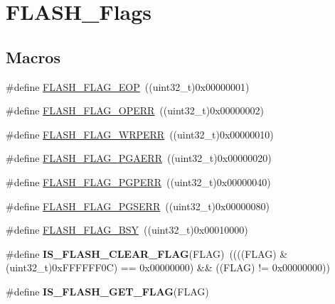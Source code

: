 \hypertarget{group___f_l_a_s_h___flags}{\section{F\-L\-A\-S\-H\-\_\-\-Flags}
\label{group___f_l_a_s_h___flags}
}
\subsection*{Macros}
\begin{DoxyCompactItemize}
\item 
\#define \hyperlink{group___f_l_a_s_h___flags_gaf043ba4d8f837350bfc7754a99fae5a9}{F\-L\-A\-S\-H\-\_\-\-F\-L\-A\-G\-\_\-\-E\-O\-P}~((uint32\-\_\-t)0x00000001)
\item 
\#define \hyperlink{group___f_l_a_s_h___flags_gad8a96ceda91fcf0d1299da933b5816f1}{F\-L\-A\-S\-H\-\_\-\-F\-L\-A\-G\-\_\-\-O\-P\-E\-R\-R}~((uint32\-\_\-t)0x00000002)
\item 
\#define \hyperlink{group___f_l_a_s_h___flags_ga6abf64f916992585899369166db3f266}{F\-L\-A\-S\-H\-\_\-\-F\-L\-A\-G\-\_\-\-W\-R\-P\-E\-R\-R}~((uint32\-\_\-t)0x00000010)
\item 
\#define \hyperlink{group___f_l_a_s_h___flags_ga2c3f4dbea065f8ea2987eada4dab30bd}{F\-L\-A\-S\-H\-\_\-\-F\-L\-A\-G\-\_\-\-P\-G\-A\-E\-R\-R}~((uint32\-\_\-t)0x00000020)
\item 
\#define \hyperlink{group___f_l_a_s_h___flags_ga88a93907641f5eeb4091a26b84c94897}{F\-L\-A\-S\-H\-\_\-\-F\-L\-A\-G\-\_\-\-P\-G\-P\-E\-R\-R}~((uint32\-\_\-t)0x00000040)
\item 
\#define \hyperlink{group___f_l_a_s_h___flags_ga25b80c716320e667162846da8be09b68}{F\-L\-A\-S\-H\-\_\-\-F\-L\-A\-G\-\_\-\-P\-G\-S\-E\-R\-R}~((uint32\-\_\-t)0x00000080)
\item 
\#define \hyperlink{group___f_l_a_s_h___flags_gad3bc368f954ad7744deda3315da2fff7}{F\-L\-A\-S\-H\-\_\-\-F\-L\-A\-G\-\_\-\-B\-S\-Y}~((uint32\-\_\-t)0x00010000)
\item 
\hypertarget{group___f_l_a_s_h___flags_ga82f8c6104c348d6aa47c7658ed3b6b36}{\#define {\bfseries I\-S\-\_\-\-F\-L\-A\-S\-H\-\_\-\-C\-L\-E\-A\-R\-\_\-\-F\-L\-A\-G}(F\-L\-A\-G)~((((F\-L\-A\-G) \& (uint32\-\_\-t)0x\-F\-F\-F\-F\-F\-F0\-C) == 0x00000000) \&\& ((\-F\-L\-A\-G) != 0x00000000))}\label{group___f_l_a_s_h___flags_ga82f8c6104c348d6aa47c7658ed3b6b36}

\item 
\#define {\bfseries I\-S\-\_\-\-F\-L\-A\-S\-H\-\_\-\-G\-E\-T\-\_\-\-F\-L\-A\-G}(F\-L\-A\-G)
\end{DoxyCompactItemize}


